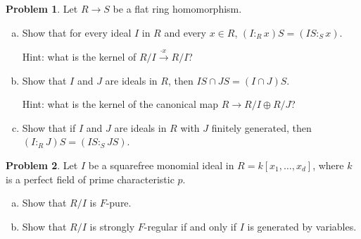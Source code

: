 \documentclass[11pt]{article}
\theoremstyle{definition}
\newtheorem{problem}{Problem}
\begin{document}
\begin{problem}
	Let $R \to S$ be a flat ring homomorphism.
	\begin{enumerate}[a)]
		\item Show that for every ideal $I$ in $R$ and every $x \in R$, $(I :_R x) S = (IS :_S x)$. 
		
	Hint: what is the kernel of $R/I \xrightarrow{\cdot x \, } R/I$?
		
		\item Show that $I$ and $J$ are ideals in $R$, then $IS \cap JS = (I \cap J)S$.
		
	Hint: what is the kernel of the canonical map $R \to R/I \oplus R/J$?	
		
		\item Show that if $I$ and $J$ are ideals in $R$ with $J$ finitely generated, then $(I :_R J)S = (IS :_S JS)$.
		
	\end{enumerate}
\end{problem}


\begin{problem}
	Let $I$ be a squarefree monomial ideal in $R = k[x_1, \ldots, x_d]$, where $k$ is a perfect field of prime characteristic $p$.
	\begin{enumerate}[a)]
		\item Show that $R/I$ is $F$-pure.
		\item Show that $R/I$ is strongly $F$-regular if and only if $I$ is generated by variables.
	\end{enumerate}
\end{problem}
\end{document}
